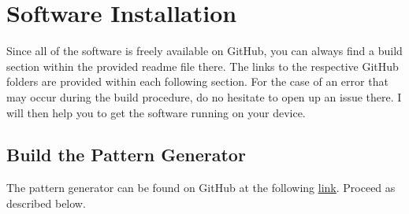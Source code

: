 \chapter{Software Installation}
\label{sec::A_si}
Since all of the software is freely available on GitHub, you can always find a build section within the provided readme file there. The links to the respective GitHub folders are provided within each following section. For the case of an error that may occur during the build procedure, do no hesitate to open up an issue there. I will then help you to get the software running on your device.
\FloatBarrier
\section{Build the Pattern Generator}
\label{sec::A1_pg}
The pattern generator can be found on GitHub at the following \href{https://github.com/mhubii/nmpc_pattern_generator}{\underline{link}}. Proceed as described below.
